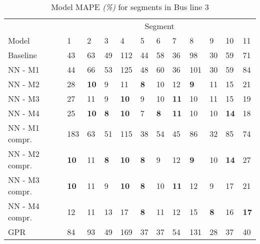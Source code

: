 \begin{table}[H]
  \centering
  \caption{Model MAPE \textit{(\%)} for segments in Bus line 3}
  \label{fig:model-mape-of-segs-203}
  \begin{adjustbox}{center}

    \begin{tabular}{l|l|l|l|l|l|l|l|l|l|l|l}
      & \multicolumn{11}{c}{Segment}                                                                                                                                                      \\
		Model          & 1             & 2             & 3             & 4             & 5             & 6            & 7              & 8             & 9             & 10             & 11               \\ 
		\hline
		Baseline       & 43          & 63          & 49          & 112         & 44          & 58         & 36           & 98          & 30          & 59           & 71             \\
		NN - M1        & 44         & 66         & 53         & 125        & 48         & 60        & 36          & 101        & 30         & 59          & 84            \\
		NN - M2        & 28         & \textbf{10}         & 9          & 11         & \textbf{8}          & 10        & 12          & \textbf{9} & 11          & 15          & 21            \\
		NN - M3        & 27         & 11         & 9         & \textbf{10}         & 9          & 10         & \textbf{11}          & 10          & 11         & 15          & 19            \\
		NN - M4        & 25         & \textbf{10} & \textbf{8} & \textbf{10}          & 7          & \textbf{8} & \textbf{11}          & 10          & 10         & \textbf{14}          & 18            \\
		NN - M1 compr. & 183        & 63         & 51         & 115        & 38         & 54        & 45          & 86         & 32         & 85           & 74            \\
		NN - M2 compr. & \textbf{10}          & 11         & \textbf{8}          & \textbf{10} & \textbf{8} & 9         & 12          & \textbf{9}          & 10          & \textbf{14} & 27            \\
		NN - M3 compr. & \textbf{10} & 11         & 9          & \textbf{10}          & \textbf{8}          & 10         & \textbf{11} & 12        & 9          & 17           & 21            \\
		NN - M4 compr. & 12         & 11         & 13         & 17         & \textbf{8}          & 11         & 12          & 15         & \textbf{8} & 16           & \textbf{17}  \\
	GPR         & 84 & 93 & 49 & 169 & 37 & 37 &  54 & 131 & 28 &37 & 40 \\
		\end{tabular}
\end{adjustbox}
\end{table}

